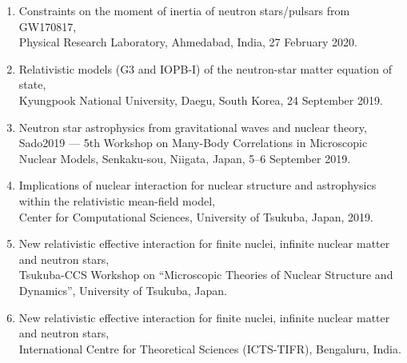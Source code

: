 
\begin{enumerate}
\item Constraints on the moment of inertia of neutron stars/pulsars from
GW170817, \\
Physical Research Laboratory, Ahmedabad, India, 27 February 2020.

\item Relativistic models (G3 and IOPB-I) of the neutron-star matter equation of
state, \\
Kyungpook National University, Daegu, South Korea, 24 September 2019.

\item Neutron star astrophysics from gravitational waves and nuclear theory, \\
Sado2019 --- 5th Workshop on Many-Body Correlations in Microscopic Nuclear
Models, Senkaku-sou, Niigata, Japan, 5--6 September 2019.

\item Implications of nuclear interaction for nuclear structure and astrophysics
within the relativistic mean-field model, \\
Center for Computational Sciences, University of Tsukuba, Japan, 2019.

\item New relativistic effective interaction for finite nuclei, infinite nuclear
matter and neutron stars, \\
Tsukuba-CCS Workshop on ``Microscopic Theories of Nuclear Structure and
Dynamics'', University of Tsukuba, Japan.

\item New relativistic effective interaction for finite nuclei, infinite nuclear
matter and neutron stars, \\
International Centre for Theoretical Sciences (ICTS-TIFR), Bengaluru, India.
\end{enumerate}

